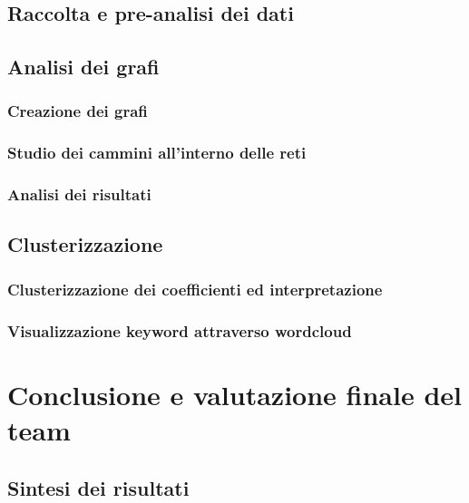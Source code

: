 \documentclass[12pt]{article}
\begin{document}
	\subsection{Raccolta e pre-analisi dei dati}
	\subsection{Analisi dei grafi}
	\subsubsection{Creazione dei grafi}
	\subsubsection{Studio dei cammini all'interno delle reti}
	\subsubsection{Analisi dei risultati}
	\subsection{Clusterizzazione}
	\subsubsection{Clusterizzazione dei coefficienti ed interpretazione}
	\subsubsection{Visualizzazione keyword attraverso wordcloud}
	\section{Conclusione e valutazione finale del team}
	\subsection{Sintesi dei risultati}
	
	
\end{document}
